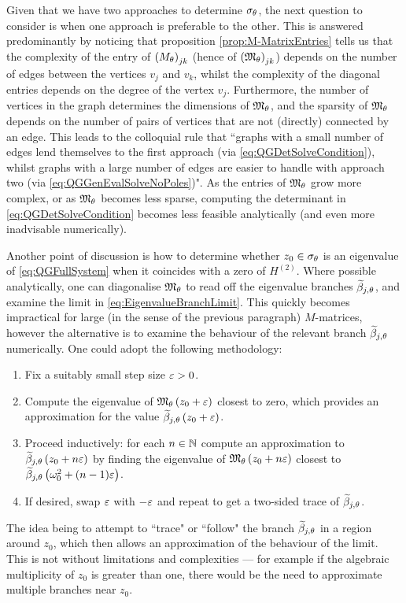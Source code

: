 Given that we have two approaches to determine $\sigma_\theta$, the next question to consider is when one approach is preferable to the other.
This is answered predominantly by noticing that proposition \ref{prop:M-MatrixEntries} tells us that the complexity of the entry of $\left( M_\theta \right)_{jk}$ (hence of $\left( \mathfrak{M}_\theta \right)_{jk}$) depends on the number of edges between the vertices $v_j$ and $v_k$, whilst the complexity of the diagonal entries depends on the degree of the vertex $v_j$.
Furthermore, the number of vertices in the graph determines the dimensions of $\mathfrak{M}_\theta$, and the sparsity of $\mathfrak{M}_\theta$ depends on the number of pairs of vertices that are not (directly) connected by an edge.
This leads to the colloquial rule that ``graphs with a small number of edges lend themselves to the first approach (via \eqref{eq:QGDetSolveCondition}), whilst graphs with a large number of edges are easier to handle with approach two (via \eqref{eq:QGGenEvalSolveNoPoles})".
As the entries of $\mathfrak{M}_\theta$ grow more complex, or as $\mathfrak{M}_\theta$ becomes less sparse, computing the determinant in \eqref{eq:QGDetSolveCondition} becomes less feasible analytically (and even more inadvisable numerically).

Another point of discussion is how to determine whether $z_0\in\sigma_\theta$ is an eigenvalue of \eqref{eq:QGFullSystem} when it coincides with a zero of $H^{(2)}$.
Where possible analytically, one can diagonalise $\mathfrak{M}_\theta$ to read off the eigenvalue branches $\widetilde{\beta}_{j,\theta}$, and examine the limit in \eqref{eq:EigenvalueBranchLimit}.
This quickly becomes impractical for large (in the sense of the previous paragraph) $M$-matrices, however the alternative is to examine the behaviour of the relevant branch $\widetilde{\beta}_{j,\theta}$ numerically.
One could adopt the following methodology:
\begin{enumerate}
	\item Fix a suitably small step size $\varepsilon>0$.
	\item Compute the eigenvalue of $\mathfrak{M}_\theta\left( z_0+\varepsilon \right)$ closest to zero, which provides an approximation for the value $\widetilde{\beta}_{j,\theta}\left( z_0+\varepsilon \right)$.
	\item Proceed inductively: for each $n\in\mathbb{N}$ compute an approximation to $\widetilde{\beta}_{j,\theta}\left( z_0+n\varepsilon \right)$ by finding the eigenvalue of $\mathfrak{M}_\theta\left( z_0+n\varepsilon \right)$ closest to $\widetilde{\beta}_{j,\theta}\left( \omega_0^2+(n-1)\varepsilon \right)$.
	\item If desired, swap $\varepsilon$ with $-\varepsilon$ and repeat to get a two-sided trace of $\widetilde{\beta}_{j,\theta}$.
\end{enumerate}
The idea being to attempt to ``trace" or ``follow" the branch $\widetilde{\beta}_{j,\theta}$ in a region around $z_0$, which then allows an approximation of the behaviour of the limit.
This is not without limitations and complexities --- for example if the algebraic multiplicity of $z_0$ is greater than one, there would be the need to approximate multiple branches near $z_0$.

